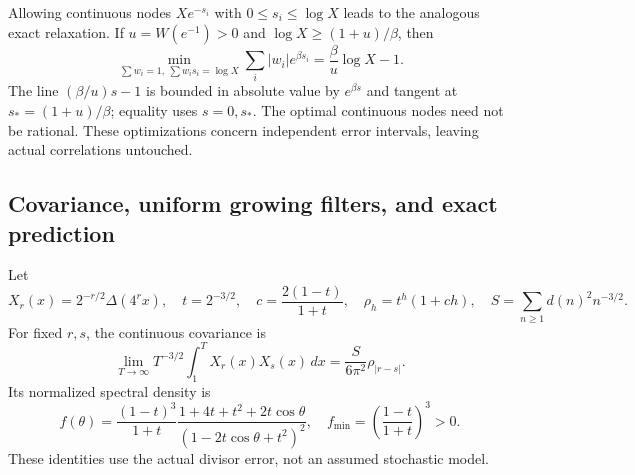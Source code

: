 \documentclass[11pt,a4paper]{article}
\theoremstyle{definition}
\theoremstyle{remark}
\numberwithin{equation}{section}
\begin{document}
Allowing continuous nodes $Xe^{-s_i}$ with $0\le s_i\le\log X$ leads to
the analogous exact relaxation.  If $u=W(e^{-1})>0$ and
$\log X\ge(1+u)/\beta$, then
\[
 \min_{\sum w_i=1,\ \sum w_is_i=\log X}\sum_i|w_i|e^{\beta s_i}
 =\frac\beta u\log X-1.
\]
The line $(\beta/u)s-1$ is bounded in absolute value by $e^{\beta s}$
and tangent at $s_*=(1+u)/\beta$; equality uses $s=0,s_*$.
The optimal continuous nodes need not be rational.  These optimizations
concern independent error intervals, leaving actual correlations untouched.

\subsection{Covariance, uniform growing filters, and exact prediction}
Let
\[
 X_r(x)=2^{-r/2}\Delta(4^rx),\quad
 t=2^{-3/2},\quad c=\frac{2(1-t)}{1+t},\quad
 \rho_h=t^h(1+ch),\quad S=\sum_{n\ge1}d(n)^2n^{-3/2}.
\]
For fixed $r,s$, the continuous covariance is
\begin{equation}\label{ar:covariance}
 \lim_{T\to\infty}T^{-3/2}\int_1^TX_r(x)X_s(x)\,dx
 =\frac S{6\pi^2}\rho_{|r-s|}.
\end{equation}
Its normalized spectral density is
\begin{equation}\label{ar:density}
 f(\theta)=\frac{(1-t)^3}{1+t}
 \frac{1+4t+t^2+2t\cos\theta}{(1-2t\cos\theta+t^2)^2},
 \quad f_{\min}=\left(\frac{1-t}{1+t}\right)^3>0.
\end{equation}
These identities use the actual divisor error, not an assumed stochastic
model.
\end{document}
